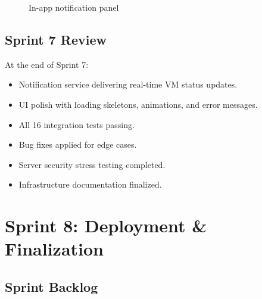 \begin{figure}[H]
\centering
{}
\caption{In-app notification panel}
\label{fig:notifications}
\end{figure}

\subsection{Sprint 7 Review}

At the end of Sprint 7:
\begin{itemize}
  \item Notification service delivering real-time VM status updates.
  \item UI polish with loading skeletons, animations, and error messages.
  \item All 16 integration tests passing.
  \item Bug fixes applied for edge cases.
  \item Server security stress testing completed.
  \item Infrastructure documentation finalized.
\end{itemize}


\section{Sprint 8: Deployment \& Finalization}


\subsection{Sprint Backlog}

